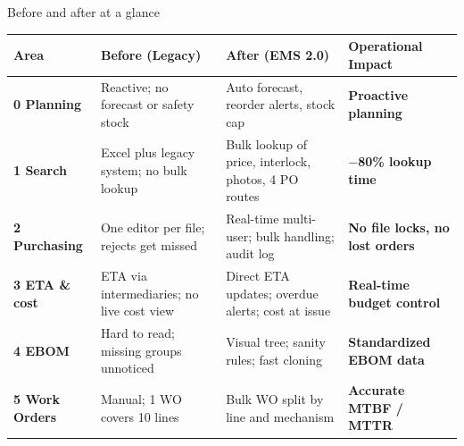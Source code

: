 \begin{frame}{Before and after at a glance}
    \vspace{0.15cm}
    
    \renewcommand{\arraystretch}{1.12}
    {\fontsize{7.5}{9.5}\selectfont
    \begin{tabularx}{\textwidth}{
        >{\bfseries\color{darkslate}}p{1.9cm}
        >{\color{mutedgray}}X
        >{\color{darkslate}}X
        >{\bfseries\color{primary}}p{3.2cm}
    }
        \toprule
        \rowcolor{tableheader}
        \textcolor{darkslate}{\textbf{Area}} & 
        \textcolor{problemtext}{\textbf{Before (Legacy)}} & 
        \textcolor{primary}{\textbf{After (EMS 2.0)}} & 
        \textcolor{darkslate}{\textbf{Operational Impact}} \\
        \midrule
        
        0 \hspace{3pt} Planning &
        Reactive; no forecast or safety stock &
        Auto forecast, reorder alerts, stock cap &
        Proactive planning \\
        
        1 \hspace{3pt} Search &
        Excel plus legacy system; no bulk lookup &
        Bulk lookup of price, interlock, photos, 4 PO routes &
        $-$80\% lookup time \\
        
        2 \hspace{3pt} Purchasing &
        One editor per file; rejects get missed &
        Real-time multi-user; bulk handling; audit log &
        No file locks, no lost orders \\
        
        3 \hspace{3pt} ETA \& cost &
        ETA via intermediaries; no live cost view &
        Direct ETA updates; overdue alerts; cost at issue &
        Real-time budget control \\
        
        4 \hspace{3pt} EBOM &
        Hard to read; missing groups unnoticed &
        Visual tree; sanity rules; fast cloning &
        Standardized EBOM data \\
        
        5 \hspace{3pt} Work Orders &
        Manual; 1 WO covers 10 lines &
        Bulk WO split by line and mechanism &
        Accurate MTBF / MTTR \\
        
        \bottomrule
    \end{tabularx}
    }
\end{frame}
